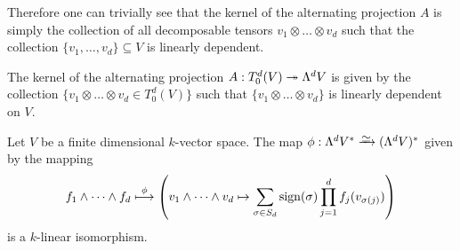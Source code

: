 Therefore one can trivially see that the kernel of the alternating projection
\(A\) is simply the collection of all decomposable tensors \(v_1 \otimes \dots
\otimes v_d\) such that the collection \(\{v_{1}, \dots, v_d\} \subseteq V\) is
linearly dependent.

\begin{corollary}\label{cor:kernel-alternating-projection}
    The kernel of the alternating projection \(A: T^d_0(V) \twoheadrightarrow \Lambda^d V\) is
    given by the collection \(\{v_{1} \otimes \dots \otimes v_d \in T^d_0(V)\}\)
    such that \(\{v_{1} \otimes \dots \otimes v_d\}\) is linearly dependent on
    \(V\).
\end{corollary}

\begin{theorem}\label{thm:iso-measure-volume-ext}
    Let \(V\) be a finite dimensional \(k\)-vector space. The map \(\phi: \Lambda^d
    V^{*} \isoto (\Lambda^dV)^{*}\) given by the mapping
    \[
        f_1 \wedge \dots \wedge f_d \overset{\phi}\longmapsto \left(
        v_1 \wedge \dots \wedge v_d \mapsto
        \sum_{\sigma \in S_d} \operatorname{sign}(\sigma) \prod_{j=1}^d f_j(v_{\sigma(j)})
        \right)
    \]
    is a \(k\)-linear isomorphism.
\end{theorem}

